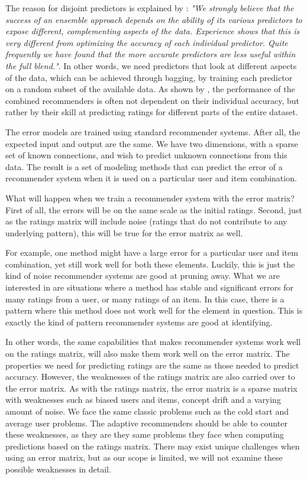 The reason for disjoint predictors is explained by \cite[p.6]{Bell2007b}:
\emph{"We strongly believe that the success of an ensemble approach depends on the ability of its various predictors 
to expose different, complementing aspects of the data. 
Experience shows that this is very different from optimizing the accuracy of each individual predictor. 
Quite frequently we have found that the more accurate predictors are less useful within the full blend."}.
In other words, we need predictors that look at different aspects of the data, which
can be achieved through bagging, by training each predictor on a random subset of the available data.
As shown by \cite[p.6]{Bell2007b}, the performance of the combined recommenders
is often not dependent on their individual accuracy, but rather by their
skill at predicting ratings for different parts of the entire dataset.

The error models are trained using standard recommender systems.
After all, the expected input and output are the same.
We have two dimensions, with a sparse set of known connections,
and wish to predict unknown connections from this data.
The result is a set of modeling methods
that can predict the error of a recommender system
when it is used on a particular user and item combination.

What will happen when we train a recommender system with the error matrix?
First of all, the errors will be on the same scale as the initial ratings.
Second, just as the ratings matrix will include noise (ratings that
do not contribute to any underlying pattern), this will be 
true for the error matrix as well.

For example, one method might have a large error for a particular user and item combination,
yet still work well for both these elements. 
Luckily, this is 
just the kind of noise recommender systems are good at pruning away.
What we are interested in are situations where a method
has stable and significant errors for many ratings from a user,
or many ratings of an item.
In this case, there is a pattern where this method does not 
work well for the element in question.
This is exactly the kind of pattern recommender systems are good at identifying.

In other words, the same capabilities that makes recommender systems work well
on the ratings matrix, will also make them work well on the error matrix.
The properties we need for predicting ratings
are the same as those needed to predict accuracy.
However, the weaknesses of the ratings matrix are also carried over to the error matrix.
As with the ratings matrix, the error matrix is a sparse matrix with weaknesses such as 
biased users and items, concept drift and a varying amount of noise.
We face the same classic problems such as the cold start and
average user problems.
The adaptive recommenders should be able to counter these weaknesses, as 
they are they same problems they face when computing predictions based on the ratings matrix.
There may exist unique challenges when using an error matrix,
but as our scope is limited, we will not examine these possible weaknesses in detail.

